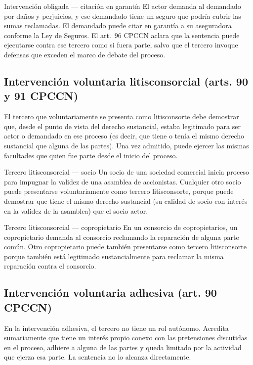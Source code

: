 \documentclass[12pt,oneside]{book}
\begin{document}
\begin{example}{Intervención obligada --- citación en garantía}
El actor demanda al demandado por daños y perjuicios, y ese demandado tiene un seguro que podría cubrir las sumas reclamadas. El demandado puede citar en garantía a su aseguradora conforme la Ley de Seguros. El art.\ 96 CPCCN aclara que la sentencia puede ejecutarse contra ese tercero como si fuera parte, salvo que el tercero invoque defensas que exceden el marco de debate del proceso.
\end{example}

\subsection{Intervención voluntaria litisconsorcial (arts. 90 y 91 CPCCN)}

El tercero que voluntariamente se presenta como litisconsorte debe demostrar que, desde el punto de vista del derecho sustancial, estaba legitimado para ser actor o demandado en ese proceso (es decir, que tiene o tenía el mismo derecho sustancial que alguna de las partes). Una vez admitido, puede ejercer las mismas facultades que quien fue parte desde el inicio del proceso.

\begin{example}{Tercero litisconsorcial --- socio}
Un socio de una sociedad comercial inicia proceso para impugnar la validez de una asamblea de accionistas. Cualquier otro socio puede presentarse voluntariamente como tercero litisconsorte, porque puede demostrar que tiene el mismo derecho sustancial (su calidad de socio con interés en la validez de la asamblea) que el socio actor.
\end{example}

\begin{example}{Tercero litisconsorcial --- copropietario}
En un consorcio de copropietarios, un copropietario demanda al consorcio reclamando la reparación de alguna parte común. Otro copropietario puede también presentarse como tercero litisconsorte porque también está legitimado sustancialmente para reclamar la misma reparación contra el consorcio.
\end{example}

\subsection{Intervención voluntaria adhesiva (art. 90 CPCCN)}

En la intervención adhesiva, el tercero no tiene un rol autónomo. Acredita sumariamente que tiene un interés propio conexo con las pretensiones discutidas en el proceso, adhiere a alguna de las partes y queda limitado por la actividad que ejerza esa parte. La sentencia no lo alcanza directamente.
\end{document}
